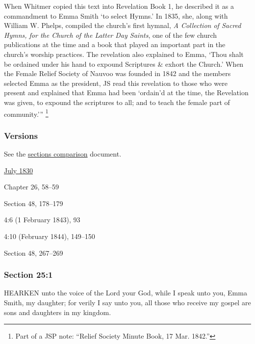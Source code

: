 			When Whitmer copied this text into Revelation Book 1, he described it as a commandment to Emma Smith `to select Hymns.' In 1835, she, along with William W. Phelps, compiled the church's first hymnal, \textit{A Collection of Sacred Hymns, for the Church of the Latter Day Saints}, one of the few church publications at the time and a book that played an important part in the church's worship practices. The revelation also explained to Emma, `Thou shalt be ordained under his hand to expound Scriptures \& exhort the Church.' When the Female Relief Society of Nauvoo was founded in 1842 and the members selected Emma as the president, JS read this revelation to those who were present and explained that Emma had been `ordain'd at the time, the Revelation was given, to expound the scriptures to all; and to teach the female part of community.'''%
				\footnote{%
					Part of a JSP note: ``Relief Society Minute Book, 17 Mar. 1842.''
					}
			
	\subsubsection{Versions}
		\label{DC25-V}
		
		See the \href{https://drive.google.com/file/d/1goAvNz8jS4R8slYfMG_db55Ty2z_vmgK/view?usp=sharing}{sections comparison} document.
	
		\begin{compactdesc}
			\item[JSP] \hyperref[EMS-1830-JS-JUL-1830-C]{July 1830}
			\item[BC] Chapter 26, 58--59
			\item[DC 1835] Section 48, 178--179
			\item[TS] 4:6 (1 February 1843), 93
			\item[MS] 4:10 (February 1844), 149--150
			\item[DC 1844] Section 48, 267--269
		\end{compactdesc}

	\subsubsection{Section 25:1} %
		\label{DC25-1}

		HEARKEN unto the voice of the Lord your God, while I speak unto you, Emma Smith, my daughter; for verily I say unto you, all those who receive my gospel are sons and daughters in my kingdom.

